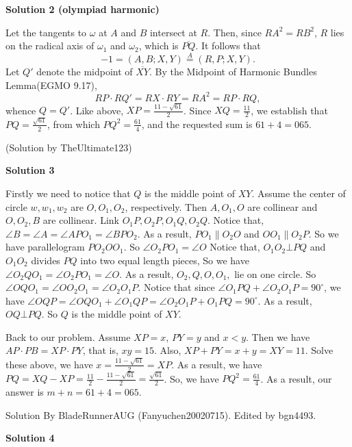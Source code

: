 \begin{enumerate}
 



\textbf{Solution 2 (olympiad harmonic)}

Let the tangents to $\omega$ at $A$ and $B$ intersect at $R$. Then, since $RA^2=RB^2$, $R$ lies on the radical axis of $\omega_1$ and $\omega_2$, which is $\overline{PQ}$. It follows that 
 \[-1=(A,B;X,Y)\stackrel{A}{=}(R,P;X,Y).\]Let $Q'$ denote the midpoint of $\overline{XY}$. By the Midpoint of Harmonic Bundles Lemma(EGMO 9.17), 
 \[RP\cdot RQ'=RX\cdot RY=RA^2=RP\cdot RQ,\]whence $Q=Q'$. Like above, $XP=\frac{11-\sqrt{61}}2$. Since $XQ=\frac{11}2$, we establish that $PQ=\frac{\sqrt{61}}2$, from which $PQ^2=\frac{61}4$, and the requested sum is $61+4=\boxed{065}$.

 (Solution by TheUltimate123)

 



\textbf{Solution 3}

Firstly we need to notice that $Q$ is the middle point of $XY$. Assume the center of circle $w, w_1, w_2$ are $O, O_1, O_2$, respectively. Then $A, O_1, O$ are collinear and $O, O_2, B$ are collinear. Link $O_1P, O_2P, O_1Q, O_2Q$. Notice that, $\angle B=\angle A=\angle APO_1=\angle BPO_2$. As a result, $PO_1\parallel O_2O$ and $OO_1\parallel O_2P$. So we have parallelogram $PO_2OO_1$. So $\angle O_2PO_1=\angle O$ Notice that, $O_1O_2\bot PQ$ and $O_1O_2$ divides $PQ$ into two equal length pieces, So we have $\angle O_2QO_1=\angle O_2PO_1=\angle O$. As a result, $O_2, Q, O, O_1,$ lie on one circle. So $\angle OQO_1=\angle OO_2O_1=\angle O_2O_1P$. Notice that since $\angle O_1PQ+\angle O_2O_1P=90^{\circ}$, we have $\angle OQP=\angle OQO_1 + \angle O_1QP = \angle O_2O_1P + O_1PQ=90^{\circ}$. As a result, $OQ\bot PQ$. So $Q$ is the middle point of $XY$.

 Back to our problem. Assume $XP=x$, $PY=y$ and $x<y$. Then we have $AP\cdot PB=XP\cdot PY$, that is, $xy=15$. Also, $XP+PY=x+y=XY=11$. Solve these above, we have $x=\frac{11-\sqrt{61}}{2}=XP$. As a result, we have $PQ=XQ-XP=\frac{11}{2}-\frac{11-\sqrt{61}}{2}=\frac{\sqrt{61}}{2}$. So, we have $PQ^2=\frac{61}{4}$. As a result, our answer is $m+n=61+4=\boxed{065}$.

 


 Solution By BladeRunnerAUG (Fanyuchen20020715). Edited by bgn4493.

 



\textbf{Solution 4}



\end{enumerate}
